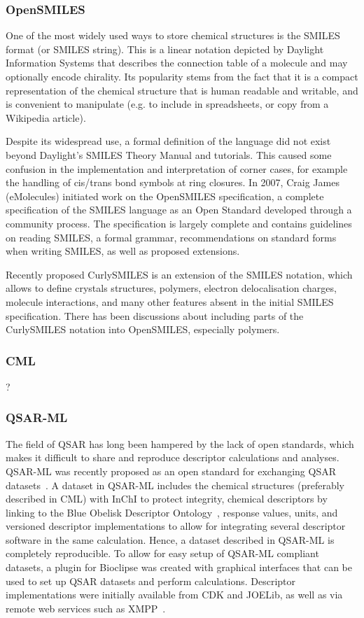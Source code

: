 \documentclass[10pt]{bmc_article}
\newenvironment{bmcformat}{\begin{raggedright}\baselineskip20pt\sloppy\setboolean{publ}{false}}{\end{raggedright}\baselineskip20pt\sloppy}
\begin{document}
\begin{bmcformat}
    \subsubsection*{OpenSMILES}

One of the most widely used ways to store chemical structures is the
SMILES format (or SMILES string). This is a linear notation depicted
by Daylight Information Systems that describes the connection table
of a molecule and may optionally encode chirality. Its popularity
stems from the fact that it is a compact representation of the
chemical structure that is human readable and writable, and is
convenient to manipulate (e.g. to include in spreadsheets, or copy
from a Wikipedia article).

Despite its widespread use, a formal
definition of the language did not exist beyond Daylight's SMILES
Theory Manual and tutorials. This caused some confusion in the
implementation and interpretation of corner cases, for example the
handling of cis/trans bond symbols at ring closures. In 2007, Craig
James (eMolecules) initiated work on the OpenSMILES specification, a
complete specification of the SMILES language as an Open Standard
developed through a community process. The specification is largely
complete and contains guidelines on reading SMILES, a formal
grammar, recommendations on standard forms when writing SMILES, as
well as proposed extensions.

Recently proposed CurlySMILES\cite{CurlySMILES} is an extension of the
SMILES notation, which allows to define crystals structures, polymers,
electron delocalisation charges, molecule interactions, and many other
features absent in the initial SMILES specification. There has been
discussions about including parts of the CurlySMILES notation into
OpenSMILES, especially polymers.

\subsubsection*{CML}
?


\subsubsection*{QSAR-ML}
The field of QSAR has long been hampered by the lack of open standards, which makes it difficult to share and reproduce descriptor calculations and analyses. QSAR-ML was recently proposed as an open standard for exchanging QSAR datasets~\cite{Spjuth:2010uq}. A dataset in QSAR-ML includes the chemical structures (preferably described in CML) with InChI to protect integrity, chemical descriptors by linking to the Blue Obelisk Descriptor Ontology~\cite{bodo}, response values, units, and versioned descriptor implementations to allow for integrating several descriptor software in the same calculation. Hence, a dataset described in QSAR-ML is completely reproducible. To allow for easy setup of QSAR-ML compliant datasets, a plugin for Bioclipse was created with graphical interfaces that can be used to set up QSAR datasets and perform calculations. Descriptor implementations were initially available from CDK and JOELib, as well as via remote web services such as XMPP~\cite{Wagener:2009uq}.



\end{bmcformat}
\end{document}
